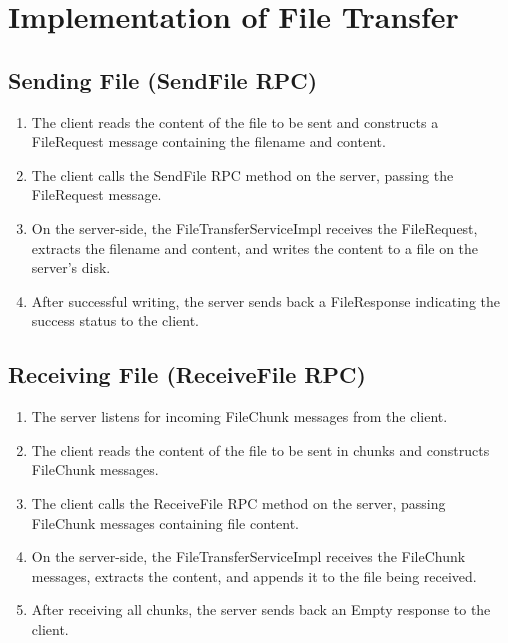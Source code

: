\documentclass{article}
\begin{document}
\section{Implementation of File Transfer}

\subsection{Sending File (SendFile RPC)}
\begin{enumerate}
    \item The client reads the content of the file to be sent and constructs a FileRequest message containing the filename and content.
    \item The client calls the SendFile RPC method on the server, passing the FileRequest message.
    \item On the server-side, the FileTransferServiceImpl receives the FileRequest, extracts the filename and content, and writes the content to a file on the server's disk.
    \item After successful writing, the server sends back a FileResponse indicating the success status to the client.
\end{enumerate}

\subsection{Receiving File (ReceiveFile RPC)}
\begin{enumerate}
    \item The server listens for incoming FileChunk messages from the client.
    \item The client reads the content of the file to be sent in chunks and constructs FileChunk messages.
    \item The client calls the ReceiveFile RPC method on the server, passing FileChunk messages containing file content.
    \item On the server-side, the FileTransferServiceImpl receives the FileChunk messages, extracts the content, and appends it to the file being received.
    \item After receiving all chunks, the server sends back an Empty response to the client.
\end{enumerate}
\end{document}

